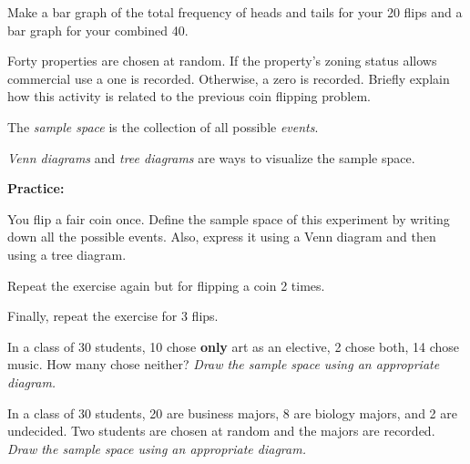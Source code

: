 \begin{problem}
\item Make a bar graph of the total frequency of heads and tails for
  your 20 flips and a bar graph for your combined 40. 

  \vfill

\item Forty properties are chosen at random. If the property's zoning
  status allows commercial use a one is recorded. Otherwise, a zero is
  recorded. Briefly explain how this activity is related to the
  previous coin flipping problem.

  \vspace{10em}
  


\clearpage

  \begin{definition}
    The \textit{sample space} is the collection of all possible
    \textit{events}.
  \end{definition}


  \begin{definition}
    \textit{Venn diagrams} and \textit{tree diagrams} are ways to
    visualize the sample space.
  \end{definition}



\item \textbf{Practice:}

  \begin{subproblem}
  \item You flip a fair coin once. Define the sample space of this
    experiment by writing down all the possible events. Also, express
    it using a Venn diagram and then using a tree diagram.

    \vfill

  \item Repeat the exercise again but for flipping a coin 2 times.

    \vfill
 
  \item Finally, repeat the exercise for 3 flips.

    \vfill

  \end{subproblem}

\clearpage

\item In a class of 30 students, 10 chose \textbf{only} art as an
  elective, 2 chose both, 14 chose music. How many chose neither?
  \textit{Draw the sample space using an appropriate diagram.}

  \vfill

\item In a class of 30 students, 20 are business majors, 8 are biology
  majors, and 2 are undecided. Two students are chosen at random and
  the majors are recorded.  \textit{Draw the sample space using an
    appropriate diagram.}

  \vfill

 \end{problem}

